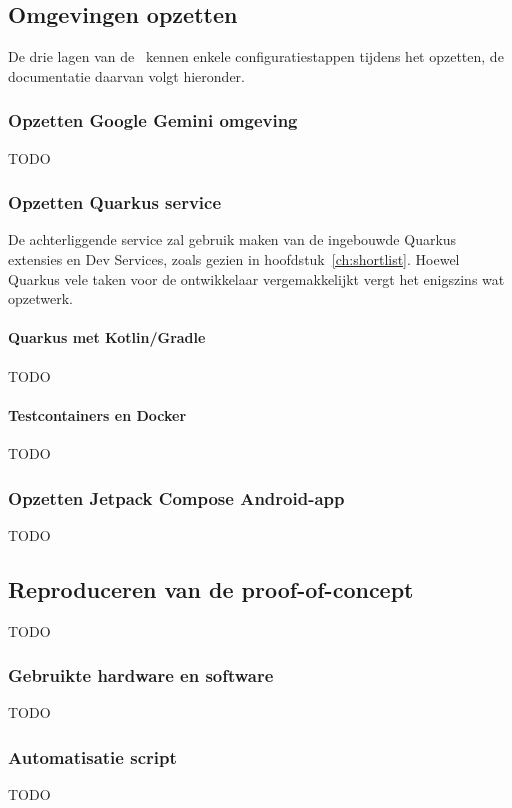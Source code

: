 \subsection{Omgevingen opzetten}
\label{subsec:omgevingen-opzetten}
De drie lagen van de~ kennen enkele configuratiestappen tijdens het opzetten, de documentatie daarvan volgt hieronder.

\subsubsection{Opzetten Google Gemini omgeving}
TODO

\subsubsection{Opzetten Quarkus service}
De achterliggende service zal gebruik maken van de ingebouwde Quarkus extensies en Dev Services, zoals gezien in hoofdstuk~\ref{ch:shortlist}.
Hoewel Quarkus vele taken voor de ontwikkelaar vergemakkelijkt vergt het enigszins wat opzetwerk.

\paragraph{Quarkus met Kotlin/Gradle}
TODO

\paragraph{Testcontainers en Docker}
TODO

\subsubsection{Opzetten Jetpack Compose Android-app}
TODO

\subsection{Reproduceren van de proof-of-concept}
\label{subsec:reproduceren-van-de-proof-of-concept}
TODO

\subsubsection{Gebruikte hardware en software}
TODO

\subsubsection{Automatisatie script}
TODO